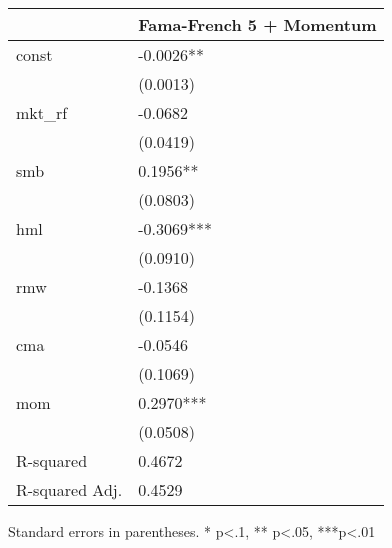 \begin{table}
\caption{}
\label{}
\begin{center}
\begin{tabular}{ll}
\hline
               & Fama-French 5 + Momentum  \\
\hline
const          & -0.0026**                 \\
               & (0.0013)                  \\
mkt\_rf        & -0.0682                   \\
               & (0.0419)                  \\
smb            & 0.1956**                  \\
               & (0.0803)                  \\
hml            & -0.3069***                \\
               & (0.0910)                  \\
rmw            & -0.1368                   \\
               & (0.1154)                  \\
cma            & -0.0546                   \\
               & (0.1069)                  \\
mom            & 0.2970***                 \\
               & (0.0508)                  \\
R-squared      & 0.4672                    \\
R-squared Adj. & 0.4529                    \\
\hline
\end{tabular}
\end{center}
\end{table}
\bigskip
Standard errors in parentheses. \newline 
* p<.1, ** p<.05, ***p<.01